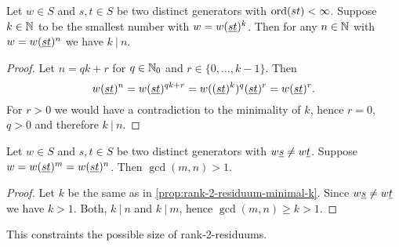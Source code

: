 \begin{prop}
	Let $w \in S$ and $s,t \in S$ be two distinct generators with $\operatorname{ord}(st) < \infty$. Suppose $k \in \mathbb{N}$ to be the smallest number with $w = w(\underline{s} \underline{t})^k$. Then for any $n \in \mathbb{N}$ with $w = w(\underline{s} \underline{t})^n$ we have $k \ | \ n$.

	\begin{proof}
		Let $n = qk + r$ for $q \in \mathbb{N}_0$ and $r \in \{0,\ldots,k-1\}$. Then
		$$ w(\underline{s} \underline{t})^n = w(\underline{s} \underline{t})^{qk+r} = w((\underline{s} \underline{t})^k)^q (\underline{s} \underline{t})^r = w(\underline{s} \underline{t})^r. $$
		For $r > 0$ we would have a contradiction to the minimality of $k$, hence $r = 0$, $q > 0$ and therefore $k \ | \ n$.
	\end{proof}
\end{prop}

\begin{coro}
	Let $w \in S$ and $s,t \in S$ be two distinct generators with $w \underline{s} \neq w \underline{t}$. Suppose $w = w(\underline{s} \underline{t})^m = w(\underline{s} \underline{t})^n$. Then $\gcd(m,n) > 1$.

	\begin{proof}
		Let $k$ be the same as in \ref{prop:rank-2-residuum-minimal-k}. Since $w \underline{s} \neq w \underline{t}$ we have $k > 1$. Both, $k \ | \ n$ and $k \ | \ m$, hence $\gcd(m,n) \geq k > 1$.
	\end{proof}
\end{coro}

This constraints the possible size of rank-2-residuums.